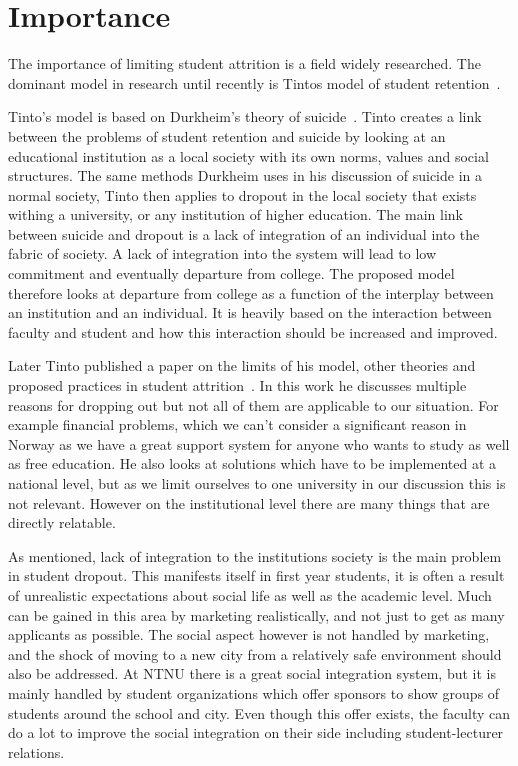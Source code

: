 \section{Importance}
The importance of limiting student attrition is a field widely researched.
The dominant model in research until recently is Tintos model of student retention~\cite{1982}.

\bigskip\noindent
Tinto's model is based on Durkheim's theory of suicide~\cite{Tinto01031975}.
Tinto creates a link between the problems of student retention and suicide by looking at an educational institution as a local society with its own norms, values and social structures.
The same methods Durkheim uses in his discussion of suicide in a normal society, 
Tinto then applies to dropout in the local society that exists withing a university, 
or any institution of higher education.
The main link between suicide and dropout is a lack of integration of an individual into the fabric of society.
A lack of integration into the system will lead to low commitment and eventually departure from college.
The proposed model therefore looks at departure from college as a function of the interplay between an institution and an individual.
It is heavily based on the interaction between faculty and student and how this interaction should be increased and improved.

\bigskip\noindent
Later Tinto published a paper on the limits of his model, other theories and proposed practices in student attrition~\cite{1982}.
In this work he discusses multiple reasons for dropping out but not all of them are applicable to our situation. For example financial problems, which we can't consider a significant reason in Norway as we have a great support system for anyone who wants to study as well as free education.
He also looks at solutions which have to be implemented at a national level, but as we limit ourselves to one university in our discussion this is not relevant.
However on the institutional level there are many things that are directly relatable.

\bigskip\noindent
As mentioned, lack of integration to the institutions society is the main problem in student dropout.
This manifests itself in first year students, it is often a result of unrealistic expectations about social life as well as the academic level.
Much can be gained in this area by marketing realistically, and not just to get as many applicants as possible.
The social aspect however is not handled by marketing, and the shock of moving to a new city from a relatively safe environment should also be addressed.
At NTNU there is a great social integration system, but it is mainly handled by student organizations which offer sponsors to show groups of students around the school and city.
Even though this offer exists, the faculty can do a lot to improve the social integration on their side including student-lecturer relations.

